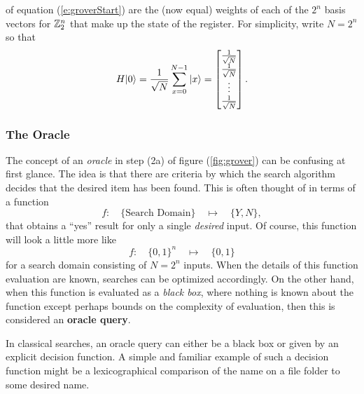 of equation (\ref{e:groverStart}) are the (now equal) weights of each 
of the $2^n$ basis vectors for ${\mathbb{Z}}_2^n$ that make up the state of the
register.
For simplicity, write $N=2^n$ so that
\begin{equation}
H{|{0}\rangle} = \frac{1}{\sqrt{N}}\sum_{x=0}^{N-1}{|{x}\rangle} 
= \left[ \begin{matrix}
            \frac{1}{\sqrt{N}}\\
            \frac{1}{\sqrt{N}}\\
            \vdots\\
            \frac{1}{\sqrt{N}}
         \end{matrix} 
  \right].
\end{equation}

\subsubsection{The Oracle}

The concept of an \emph{oracle} in step (2a) of figure (\ref{fig:grover}) 
can be confusing at first glance.  The idea is that there are criteria
by which the search algorithm decides that the desired item has been found.
This is often thought of in terms of a function
\begin{equation}
f\colon\quad\lbrace\mbox{Search Domain}\rbrace\quad\mapsto\quad\lbrace Y,N\rbrace,
\end{equation}
that obtains a ``yes'' result for only a single {\sl desired} input.
Of course, this function will look a little more like 
\begin{equation}
f\colon\quad\lbrace 0,1\rbrace^n\quad\mapsto\quad\lbrace 0,1\rbrace
\end{equation}
for a search domain consisting of $N=2^n$ inputs.
When the details of this function evaluation are known, searches can
be optimized accordingly.  On the other hand, when this function is 
evaluated as a \emph{black box}, where nothing is known about the function 
except perhaps bounds on the complexity of evaluation, then this is 
considered an \textbf{oracle query}.

In classical searches, an oracle query can either be a black box
or given by an explicit decision function.  A simple and familiar 
example of such a decision function might be a lexicographical comparison
of the name on a file folder to some desired name.

